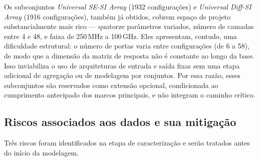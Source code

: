 Os subconjuntos \textit{Universal SE-SI Array} (1932 configurações) e
\textit{Universal Diff-SI Array} (1916 configurações), também já obtidos, cobrem
espaço de projeto substancialmente mais rico — quatorze parâmetros variados,
número de camadas entre 4 e 48, e faixa de 250\,MHz a 100\,GHz. Eles apresentam,
contudo, uma dificuldade estrutural: o número de portas varia entre configurações
(de 6 a 58), de modo que a dimensão da matriz de resposta não é constante ao
longo da base. Isso inviabiliza o uso de arquiteturas de entrada e saída fixas
sem uma etapa adicional de agregação ou de modelagem por conjuntos. Por essa
razão, esses subconjuntos são reservados como extensão opcional, condicionada ao
cumprimento antecipado dos marcos principais, e não integram o caminho crítico.

\subsection{Riscos associados aos dados e sua mitigação}
\label{subsec:riscos_dados}

Três riscos foram identificados na etapa de caracterização e serão tratados
antes do início da modelagem.

